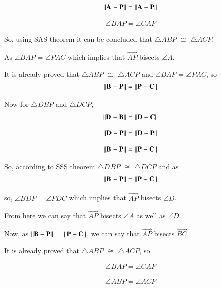 \documentclass[journal,12pt,twocolumn]{IEEEtran}
\begin{document}
\begin{align}
\left\lVert\mathbf{A}-\mathbf{P}\right\rVert = \left\lVert\mathbf{A}-\mathbf{P}\right\rVert
\end{align}

\begin{align}
\angle BAP = \angle CAP
\end{align}
\label{angle1}

So, using SAS theorem it can be concluded that $\triangle ABP$ $\cong$ $\triangle ACP$.

As $\angle BAP$ = $\angle PAC$ which implies that $\vec{AP}$ bisects $\angle A$.

It is already proved that $\triangle ABP$ $\cong$ $\triangle ACP$ and $\angle BAP$ = $\angle PAC$, so 
\begin{align}
\left\lVert\mathbf{B}-\mathbf{P}\right\rVert = \left\lVert\mathbf{P}-\mathbf{C}\right\rVert
\end{align}

Now for $\triangle DBP$ and $\triangle DCP$,
\begin{align}
\left\lVert\mathbf{D}-\mathbf{B}\right\rVert = \left\lVert\mathbf{D}-\mathbf{C}\right\rVert
\end{align}

\begin{align}
\left\lVert\mathbf{D}-\mathbf{P}\right\rVert = \left\lVert\mathbf{D}-\mathbf{P}\right\rVert
\end{align}

\begin{align}
\left\lVert\mathbf{B}-\mathbf{P}\right\rVert = \left\lVert\mathbf{P}-\mathbf{C}\right\rVert
\end{align}

So, according to SSS theorem $\triangle DBP$ $\cong$ $\triangle DCP$ and as 
\begin{align}
\left\lVert\mathbf{B}-\mathbf{P}\right\rVert = \left\lVert\mathbf{P}-\mathbf{C}\right\rVert
\end{align}

so, $\angle BDP$ = $\angle PDC$ which implies that $\vec{AP}$ bisects $\angle D$.

From here we can say that $\vec{AP}$ bisects $\angle A$ as well as $\angle D$.

Now, as $\left\lVert\mathbf{B}-\mathbf{P}\right\rVert$ = $\left\lVert\mathbf{P}-\mathbf{C}\right\rVert$, we can say that $\vec{AP}$ bisects $\vec{BC}$.

It is already proved that $\triangle ABP$ $\cong$ $\triangle ACP$, so

\begin{align}
\angle BAP = \angle CAP
\end{align}

\begin{align}
\angle ABP = \angle ACP
\end{align}
\end{document}
